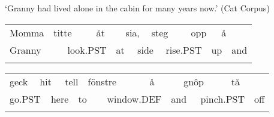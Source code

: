 \begin{styleTranslation}
‘Granny had lived alone in the cabin for many years now.’ (Cat Corpus)

\end{styleTranslation}

\begin{tabular}{llllllllllllll}
\lsptoprule
Momma & \multicolumn{2}{l}{titte

} & \multicolumn{2}{l}{åt

} & \multicolumn{2}{l}{sia, 

} & \multicolumn{2}{l}{steg

} & \multicolumn{2}{l}{opp

} & \multicolumn{2}{l}{å

} & \\
\multicolumn{2}{l}{Granny

} & \multicolumn{2}{l}{look.PST

} & \multicolumn{2}{l}{at

} & \multicolumn{2}{l}{side

} & \multicolumn{2}{l}{rise.PST

} & \multicolumn{2}{l}{up

} & \multicolumn{2}{l}{and

}\\
\lspbottomrule
\end{tabular}

\begin{tabular}{llllllllllllll}
\lsptoprule
geck & \multicolumn{2}{l}{hit

} & \multicolumn{2}{l}{tell

} & \multicolumn{2}{l}{fönstre

} & \multicolumn{2}{l}{å

} & \multicolumn{2}{l}{gnôp

} & \multicolumn{2}{l}{tå

} & \\
\multicolumn{2}{l}{go.PST

} & \multicolumn{2}{l}{here

} & \multicolumn{2}{l}{to

} & \multicolumn{2}{l}{window.DEF

} & \multicolumn{2}{l}{and

} & \multicolumn{2}{l}{pinch.PST

} & \multicolumn{2}{l}{off

}\\
\lspbottomrule
\end{tabular}

